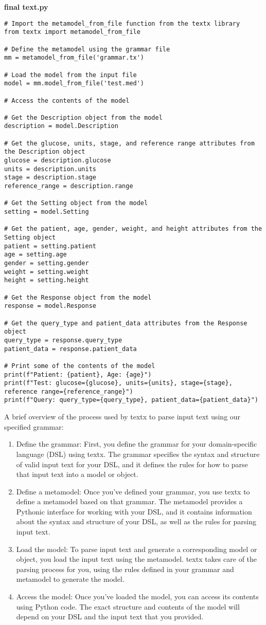 \textbf{final text.py}
\begin{lstlisting}
# Import the metamodel_from_file function from the textx library
from textx import metamodel_from_file

# Define the metamodel using the grammar file
mm = metamodel_from_file('grammar.tx')

# Load the model from the input file
model = mm.model_from_file('test.med')

# Access the contents of the model

# Get the Description object from the model
description = model.Description

# Get the glucose, units, stage, and reference range attributes from the Description object
glucose = description.glucose
units = description.units
stage = description.stage
reference_range = description.range

# Get the Setting object from the model
setting = model.Setting

# Get the patient, age, gender, weight, and height attributes from the Setting object
patient = setting.patient
age = setting.age
gender = setting.gender
weight = setting.weight
height = setting.height

# Get the Response object from the model
response = model.Response

# Get the query_type and patient_data attributes from the Response object
query_type = response.query_type
patient_data = response.patient_data

# Print some of the contents of the model
print(f"Patient: {patient}, Age: {age}")
print(f"Test: glucose={glucose}, units={units}, stage={stage}, reference range={reference_range}")
print(f"Query: query_type={query_type}, patient_data={patient_data}")
\end{lstlisting}

A brief overview of the process used by textx to parse input text using our specified grammar:
\begin{enumerate}
    \item Define the grammar: First, you define the grammar for your domain-specific language (DSL) using textx. The grammar specifies the syntax and structure of valid input text for your DSL, and it defines the rules for how to parse that input text into a model or object.
    \item Define a metamodel: Once you've defined your grammar, you use textx to define a metamodel based on that grammar. The metamodel provides a Pythonic interface for working with your DSL, and it contains information about the syntax and structure of your DSL, as well as the rules for parsing input text.
    \item Load the model: To parse input text and generate a corresponding model or object, you load the input text using the metamodel. textx takes care of the parsing process for you, using the rules defined in your grammar and metamodel to generate the model.
    \item Access the model: Once you've loaded the model, you can access its contents using Python code. The exact structure and contents of the model will depend on your DSL and the input text that you provided.
\end{enumerate}

